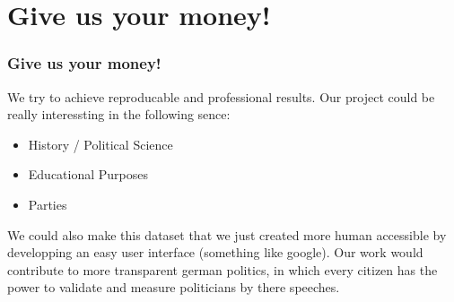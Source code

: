 \documentclass[11pt, a4paper]{beamer}
\begin{document}
\section{Give us your money!}
\begin{frame}
\frametitle{Give us your money!}
We try to achieve reproducable and professional results. Our project could be
really interessting in the following sence:
\begin{itemize}
\item History / Political Science  
\item Educational Purposes
\item Parties 
\end{itemize}
We could also make this dataset that we just created more human accessible by 
developping an easy user interface (something like google).
Our work would contribute to more transparent german politics, in which every 
citizen has the power to validate and measure politicians by there speeches.
\end{frame}

\printbibliography
\end{document}
